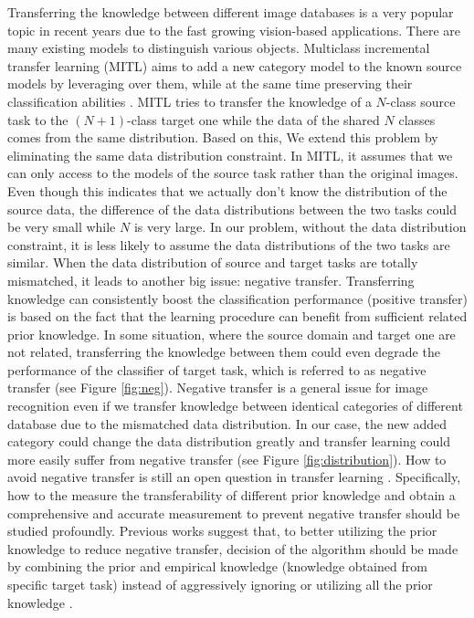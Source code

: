 Transferring the knowledge between different image databases is a very popular topic in recent years due to the fast growing vision-based applications. There are many existing models to distinguish various objects. Multiclass incremental transfer learning (MITL) aims to add a new category model to the known source models by leveraging over them, while at the same time preserving their classification abilities \cite{kuzborskij2013n}. MITL tries to transfer the knowledge of a $N$-class source task to the $(N+1)$-class target one while the data of the shared $N$ classes comes from the same distribution.
Based on this, We extend this problem by eliminating the same data distribution constraint. 
In MITL, it assumes that we can only access to the models of the source task rather than the original images. Even though this indicates that we actually don't know the distribution of the source data, the difference of the data distributions between the two tasks could be very small while $N$ is very large. In our problem, without the data distribution constraint, it is less likely to assume the data distributions of the two tasks are similar. When the data distribution of source and target tasks are totally mismatched, it leads to another big issue: negative transfer. 
Transferring knowledge can consistently boost the classification performance (positive transfer) is based on the fact that the learning procedure can benefit from sufficient related prior knowledge. In some situation, where the source domain and target one are not related, transferring the knowledge between them could even degrade the performance of the classifier of target task, which is referred to as negative transfer (see Figure \ref{fig:neg}). 
Negative transfer is a general issue for image recognition even if we transfer knowledge between identical categories of different database due to the mismatched data distribution. In our case, the new added category could change the data distribution greatly and transfer learning could more easily suffer from negative transfer (see Figure \ref{fig:distribution}). 
How to avoid negative transfer is still an open question in transfer learning \cite{Lu201514}. Specifically, how to the measure the transferability of different prior knowledge and obtain a comprehensive and accurate measurement to prevent negative transfer should be studied profoundly. Previous works suggest that, to better utilizing the prior knowledge to reduce negative transfer, decision of the algorithm should be made by combining the prior and empirical knowledge (knowledge obtained from specific target task) instead of aggressively ignoring or utilizing all the prior knowledge \cite{tommasi2014learning} \cite{kuzborskij2013n} \cite{yang2007cross} \cite{aytar2011tabula}.
